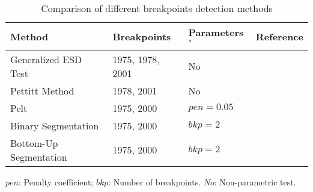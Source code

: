 \begin{table}[h!]
    \centering
    \begin{tabularx}{\textwidth}{llll}
        \toprule
        \textbf{Method} & \textbf{Breakpoints} & \textbf{Parameters$^*$} & \textbf{Reference} \\
        \midrule
        Generalized ESD Test & 1975, 1978, 2001 & No & \cite{matteson2014} \\
        Pettitt Method & 1978, 2001 & No & \cite{pettitt1979} \\
        Pelt & 1975, 2000 & $pen=0.05$ & \cite{killick2012} \\
        Binary Segmentation & 1975, 2000 & $bkp=2$ & \cite{bai1997} \\
        Bottom-Up Segmentation & 1975, 2000 & $bkp=2$ & \cite{keogh2001} \\
        \bottomrule
    \end{tabularx}
    \footnotesize{$pen$: Penalty coefficient; $bkp$: Number of breakpoints. $No$: Non-parametric test.}
    \caption{Comparison of different breakpoints detection methods}\label{table:breakpoint-detection-methods}
\end{table}
